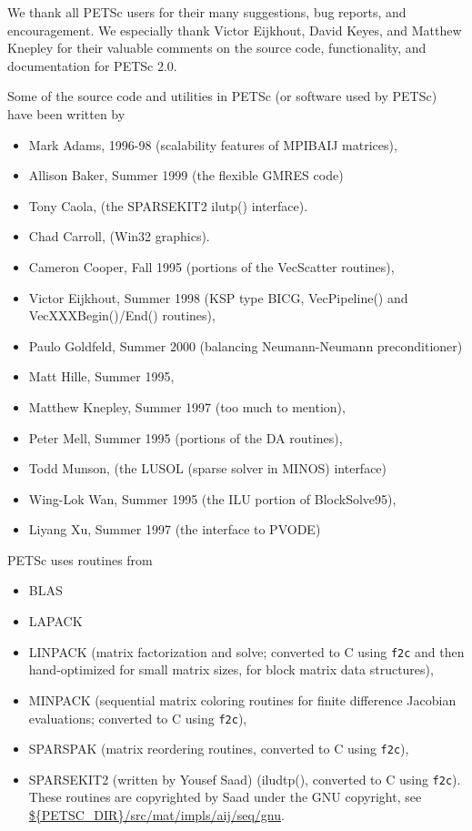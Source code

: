 %
%

\medskip \medskip \noindent
We thank all PETSc users for their many suggestions, bug reports, and
encouragement.  We especially thank Victor Eijkhout, David Keyes, and
Matthew Knepley for their valuable comments on the source code,
functionality, and documentation for PETSc 2.0.


\vspace{.3in}
\noindent
Some of the source code and utilities in PETSc (or software used by PETSc)
have been written by 
\begin{itemize}
  \item Mark Adams, 1996-98 (scalability features of MPIBAIJ matrices),
  \item Allison Baker, Summer 1999 (the flexible GMRES code)
  \item Tony Caola, (the SPARSEKIT2 ilutp() interface).
  \item Chad Carroll, (Win32 graphics).
  \item Cameron Cooper, Fall 1995 (portions of the VecScatter routines), 
  \item Victor Eijkhout, Summer 1998 (KSP type BICG, VecPipeline() and VecXXXBegin()/End() routines), 
  \item Paulo Goldfeld, Summer 2000 (balancing Neumann-Neumann preconditioner)
  \item Matt Hille, Summer 1995,
  \item Matthew Knepley, Summer 1997 (too much to mention),
  \item Peter Mell, Summer 1995 (portions of the DA routines),
  \item Todd Munson, (the LUSOL (sparse solver in MINOS) interface)
  \item Wing-Lok Wan, Summer 1995 (the ILU portion of BlockSolve95),
  \item Liyang Xu, Summer 1997 (the interface to PVODE)
\end{itemize}

\vspace{.3in}
\noindent
PETSc uses routines from 
\begin{itemize}
  \item BLAS
  \item LAPACK
  \item LINPACK      (matrix factorization and solve; converted to C using {\tt f2c} and then 
                      hand-optimized for small matrix sizes, for block matrix data structures),
  \item MINPACK      (sequential matrix coloring routines for finite difference Jacobian
                       evaluations; converted to C using {\tt f2c}),
  \item SPARSPAK     (matrix reordering routines, converted to C using {\tt f2c}),
  \item SPARSEKIT2 (written by Yousef Saad) (iludtp(), converted to C using {\tt f2c}). These routines 
                     are copyrighted by Saad under the GNU copyright, see \url{${PETSC_DIR}/src/mat/impls/aij/seq/gnu}.
\end{itemize}


